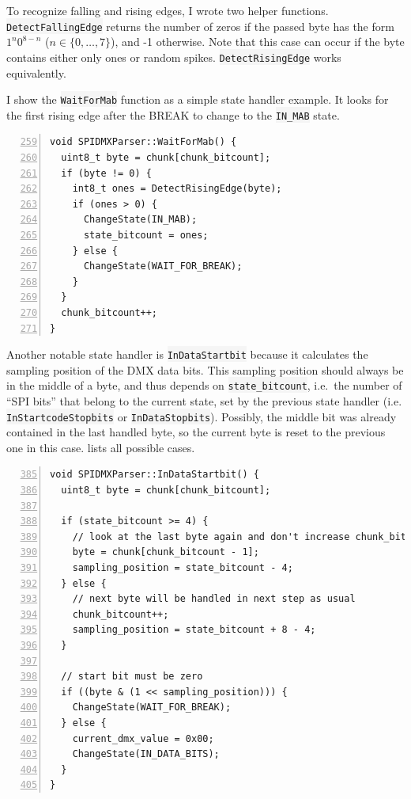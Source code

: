 To recognize falling and
rising edges, I wrote two helper functions.
\colorbox{WhiteSmoke}{\lstinline!DetectFallingEdge!} returns the number of zeros if the passed
byte has the form \(1^n 0^{8-n}\) (\(n \in \{ 0, …, 7 \}\)), and -1
otherwise. Note that this case can occur if the byte contains either
only ones or random spikes. \colorbox{WhiteSmoke}{\lstinline!DetectRisingEdge!} works
equivalently.

I show the \colorbox{WhiteSmoke}{\lstinline!WaitForMab!} function as a simple state handler
example. It looks for the first rising edge after the BREAK to change to
the \colorbox{WhiteSmoke}{\lstinline!IN_MAB!} state.

\begin{lstlisting}[numbers=left, style=myCpp, firstnumber=259, caption={[Excerpt from \glsfont{SPIDMXParser.cpp}]Excerpt from \gls{spidmx:SPIDMXParser.cpp}.}]
void SPIDMXParser::WaitForMab() {
  uint8_t byte = chunk[chunk_bitcount];
  if (byte != 0) {
    int8_t ones = DetectRisingEdge(byte);
    if (ones > 0) {
      ChangeState(IN_MAB);
      state_bitcount = ones;
    } else {
      ChangeState(WAIT_FOR_BREAK);
    }
  }
  chunk_bitcount++;
}
\end{lstlisting}

Another notable state handler is \colorbox{WhiteSmoke}{\lstinline!InDataStartbit!} because it
calculates the sampling position of the DMX data bits. This sampling
position should always be in the middle of a byte, and thus depends on
\colorbox{WhiteSmoke}{\lstinline!state_bitcount!}, i.e.~the number of ``SPI bits'' that belong
to the current state, set by the previous state handler (i.e.
\colorbox{WhiteSmoke}{\lstinline!InStartcodeStopbits!} or \colorbox{WhiteSmoke}{\lstinline!InDataStopbits!}).
Possibly, the middle bit was already contained in the last handled byte,
so the current byte is reset to the previous one in this case.
 lists all possible cases.

\begin{lstlisting}[numbers=left, style=myCpp, firstnumber=385]
void SPIDMXParser::InDataStartbit() {
  uint8_t byte = chunk[chunk_bitcount];

  if (state_bitcount >= 4) {
    // look at the last byte again and don't increase chunk_bitcount
    byte = chunk[chunk_bitcount - 1];
    sampling_position = state_bitcount - 4;
  } else {
    // next byte will be handled in next step as usual
    chunk_bitcount++;
    sampling_position = state_bitcount + 8 - 4;
  }

  // start bit must be zero
  if ((byte & (1 << sampling_position))) {
    ChangeState(WAIT_FOR_BREAK);
  } else {
    current_dmx_value = 0x00;
    ChangeState(IN_DATA_BITS);
  }
}
\end{lstlisting}


